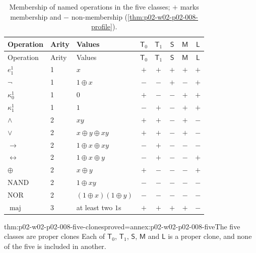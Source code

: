 \begingroup\small
\begin{longtable}{@{}lllccccc@{}}
\caption{Membership of named operations in the five classes; \(+\) marks
membership and \(-\) non-membership
(\cref{thm:p02-w02-p02-008-profile}).}
\label{tab:p02-w02-p02-008-profile}\\
\toprule
Operation & Arity & Values & \(\mathsf T_0\) & \(\mathsf T_1\) & \(\mathsf S\) & \(\mathsf M\) & \(\mathsf L\) \\
\midrule\endfirsthead
\toprule
Operation & Arity & Values & \(\mathsf T_0\) & \(\mathsf T_1\) & \(\mathsf S\) & \(\mathsf M\) & \(\mathsf L\) \\
\midrule\endhead
\(e^1_1\) & 1 & \(x\) & \(+\) & \(+\) & \(+\) & \(+\) & \(+\) \\
\(\neg\) & 1 & \(1\oplus x\) & \(-\) & \(-\) & \(+\) & \(-\) & \(+\) \\
\(\kappa^1_0\) & 1 & \(0\) & \(+\) & \(-\) & \(-\) & \(+\) & \(+\) \\
\(\kappa^1_1\) & 1 & \(1\) & \(-\) & \(+\) & \(-\) & \(+\) & \(+\) \\
\(\land\) & 2 & \(xy\) & \(+\) & \(+\) & \(-\) & \(+\) & \(-\) \\
\(\lor\) & 2 & \(x\oplus y\oplus xy\) & \(+\) & \(+\) & \(-\) & \(+\) & \(-\) \\
\(\to\) & 2 & \(1\oplus x\oplus xy\) & \(-\) & \(+\) & \(-\) & \(-\) & \(-\) \\
\(\leftrightarrow\) & 2 & \(1\oplus x\oplus y\) & \(-\) & \(+\) & \(-\) & \(-\) & \(+\) \\
\(\oplus\) & 2 & \(x\oplus y\) & \(+\) & \(-\) & \(-\) & \(-\) & \(+\) \\
\(\mathrm{NAND}\) & 2 & \(1\oplus xy\) & \(-\) & \(-\) & \(-\) & \(-\) & \(-\) \\
\(\mathrm{NOR}\) & 2 & \((1\oplus x)(1\oplus y)\) & \(-\) & \(-\) & \(-\) & \(-\) & \(-\) \\
\(\operatorname{maj}\) & 3 & at least two \(1\)s & \(+\) & \(+\) & \(+\) & \(+\) & \(-\) \\
\bottomrule
\end{longtable}
\endgroup

\begin{hblemma}{thm:p02-w02-p02-008-five-clones}{proved=annex:p02-w02-p02-008-five}{The five classes are proper clones}
Each of \(\mathsf T_0\), \(\mathsf T_1\), \(\mathsf S\), \(\mathsf M\)
and \(\mathsf L\) is a proper clone, and none of the five is included in another.
\end{hblemma}

